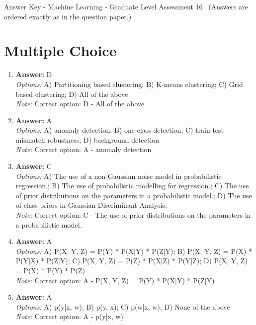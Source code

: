 \documentclass[12pt]{article}
\begin{document}
\begin{center}
Answer Key - Machine Learning - Graduate Level Assessment 16 \
\small (Answers are ordered exactly as in the question paper.)
\end{center}

\section*{Multiple Choice}
\begin{enumerate}[label=\arabic*.]
\item \textbf{Answer:} D
\\ \textit{Options:} A) Partitioning based clustering; B) K-means clustering; C) Grid based clustering; D) All of the above
\\ \textit{Note:} Correct option: D - All of the above
\item \textbf{Answer:} A
\\ \textit{Options:} A) anomaly detection; B) one-class detection; C) train-test mismatch robustness; D) background detection
\\ \textit{Note:} Correct option: A - anomaly detection
\item \textbf{Answer:} C
\\ \textit{Options:} A) The use of a non-Gaussian noise model in probabilistic regression.; B) The use of probabilistic modelling for regression.; C) The use of prior distributions on the parameters in a probabilistic model.; D) The use of class priors in Gaussian Discriminant Analysis.
\\ \textit{Note:} Correct option: C - The use of prior distributions on the parameters in a probabilistic model.
\item \textbf{Answer:} A
\\ \textit{Options:} A) P(X, Y, Z) = P(Y) * P(X|Y) * P(Z|Y); B) P(X, Y, Z) = P(X) * P(Y|X) * P(Z|Y); C) P(X, Y, Z) = P(Z) * P(X|Z) * P(Y|Z); D) P(X, Y, Z) = P(X) * P(Y) * P(Z)
\\ \textit{Note:} Correct option: A - P(X, Y, Z) = P(Y) * P(X|Y) * P(Z|Y)
\item \textbf{Answer:} A
\\ \textit{Options:} A) p(y|x, w); B) p(y, x); C) p(w|x, w); D) None of the above
\\ \textit{Note:} Correct option: A - p(y|x, w)
\end{enumerate}
\end{document}
